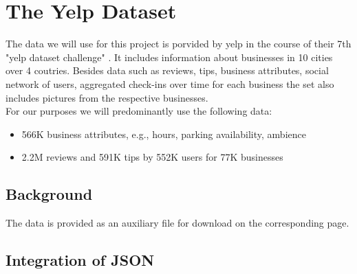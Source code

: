 \section{The Yelp Dataset} %
\label{cha:yelp}
The data we will use for this project is porvided by yelp in the course of their 7th "yelp dataset challenge" \cite{www:yelpdataset}. It includes information about businesses in 10 cities over 4 coutries. Besides data such as reviews, tips, business attributes, social network of users, aggregated check-ins over time for each business the set also includes pictures from the respective businesses.\\ 
For our purposes we will predominantly use the following data: 
\begin{itemize}
\item566K business attributes, e.g., hours, parking availability, ambience
\item2.2M reviews and 591K tips by 552K users for 77K businesses
\end{itemize}

\subsection{Background} %
\label{sec:background}
The data is provided as an auxiliary file for download on the corresponding page.

\subsection{Integration of JSON}
\label{sec:integration}